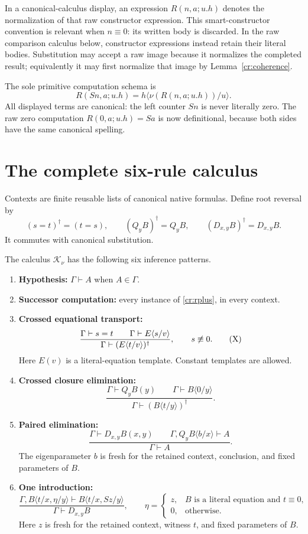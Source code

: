 \documentclass[11pt]{article}
\theoremstyle{definition}\newtheorem{definition}[theorem]{Definition}
\newcommand{\norm}[1]{\nu(#1)}
\newcommand{\subc}[2]{#1\langle #2\rangle}
\newcommand{\lit}{\mathrel{\equiv}}
\newcommand{\Knorm}{\mathcal K_\nu}
\begin{document}
In a canonical-calculus display, an expression \(R(n,a;u.h)\) denotes the normalization of that raw constructor expression. This smart-constructor convention is relevant when \(n\lit0\): its written body is discarded. In the raw comparison calculus below, constructor expressions instead retain their literal bodies. Substitution may accept a raw image because it normalizes the completed result; equivalently it may first normalize that image by Lemma~\ref{cr:coherence}.

The sole primitive computation schema is
\[
R(Sn,a;u.h)=\subc h{\norm{R(n,a;u.h)}/u}.
\tag{\(R_+\)}\label{cr:rplus}
\]
All displayed terms are canonical: the left counter \(Sn\) is never literally zero. The raw zero computation
\(R(0,a;u.h)=Sa\) is now definitional, because both sides have the same canonical spelling.

\section{The complete six-rule calculus}

Contexts are finite reusable lists of canonical native formulas. Define root reversal by
\[
(s=t)^\dagger=(t=s),\qquad
(Q_yB)^\dagger=Q_yB,\qquad
(D_{x,y}B)^\dagger=D_{x,y}B.
\]
It commutes with canonical substitution.

The calculus \(\Knorm\) has the following six inference patterns.

\begin{enumerate}[leftmargin=*]
\item \textbf{Hypothesis:} \(\Gamma\vdash A\) when \(A\in\Gamma\).
\item \textbf{Successor computation:} every instance of \eqref{cr:rplus}, in every context.
\item \textbf{Crossed equational transport:}
\[
\frac{\Gamma\vdash s=t\qquad
      \Gamma\vdash \subc E{s/v}}
     {\Gamma\vdash (\subc E{t/v})^\dagger},
\qquad s\not\lit0.
\tag{X}
\]
Here \(E(v)\) is a literal-equation template. Constant templates are allowed.
\item \textbf{Crossed closure elimination:}
\[
\frac{\Gamma\vdash Q_yB(y)\qquad\Gamma\vdash\subc B{0/y}}
     {\Gamma\vdash(\subc B{t/y})^\dagger}.
\tag{QX}
\]
\item \textbf{Paired elimination:}
\[
\frac{\Gamma\vdash D_{x,y}B(x,y)\qquad
      \Gamma,Q_y\subc B{b/x}\vdash A}
     {\Gamma\vdash A}.
\tag{DE}
\]
The eigenparameter \(b\) is fresh for the retained context, conclusion, and fixed parameters of \(B\).
\item \textbf{One introduction:}
\[
\frac{\Gamma,\subc B{t/x,\eta/y}
          \vdash\subc B{t/x,Sz/y}}
     {\Gamma\vdash D_{x,y}B},
\qquad
\eta=
\begin{cases}
z,&B\text{ is a literal equation and }t\lit0,\\
0,&\text{otherwise}.
\end{cases}
\tag{WI}
\]
Here \(z\) is fresh for the retained context, witness \(t\), and fixed parameters of \(B\).
\end{enumerate}
\end{document}
